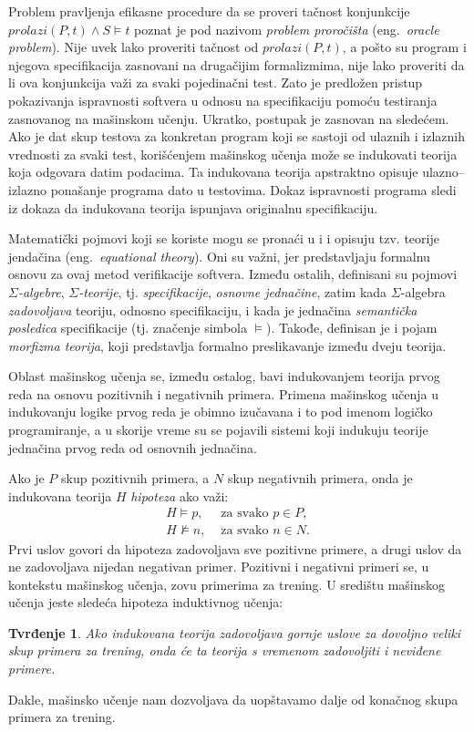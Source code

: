 \documentclass[a4paper]{article}
\newtheorem*{tvrdjenje}{Tvrđenje}
\theoremstyle{definition}
\begin{document}
{\par Problem pravljenja efikasne procedure da se proveri tačnost konjunkcije $prolazi(P,t)\wedge S\models t$ poznat je pod nazivom \emph{problem proročišta} (eng.~{\em oracle problem}). Nije uvek lako proveriti tačnost od $prolazi(P,t)$, a pošto su program i njegova specifikacija zasnovani na drugačijim formalizmima, nije lako proveriti da li ova konjunkcija važi za svaki pojedinačni test. Zato je predložen pristup pokazivanja ispravnosti softvera u odnosu na specifikaciju pomoću testiranja zasnovanog na mašinskom učenju. Ukratko, postupak je zasnovan na sledećem. Ako je dat skup testova za konkretan program koji se sastoji od ulaznih i izlaznih vrednosti za svaki test, korišćenjem mašinskog učenja može se indukovati teorija koja odgovara datim podacima. Ta indukovana teorija apstraktno opisuje ulazno--izlazno ponašanje programa dato u testovima. Dokaz ispravnosti programa sledi iz dokaza da indukovana teorija ispunjava originalnu specifikaciju.

\par Matematički pojmovi koji se koriste mogu se pronaći u \cite{verify} i \cite{equationaltheory} i opisuju tzv. teorije jendačina (eng.~{\em equational theory}). Oni su važni, jer predstavljaju formalnu osnovu za ovaj metod verifikacije softvera. Između ostalih, definisani su pojmovi \emph{$\Sigma$-algebre}, \emph{$\Sigma$-teorije}, tj. \emph{specifikacije}, \emph{osnovne jednačine}, zatim kada $\Sigma$-algebra \emph{zadovoljava} teoriju, odnosno specifikaciju, i kada je jednačina \emph{semantička posledica} specifikacije (tj. značenje simbola $\models$). Takođe, definisan je i pojam \emph{morfizma teorija}, koji predstavlja formalno preslikavanje između dveju teorija.

\par Oblast mašinskog učenja se, između ostalog, bavi indukovanjem teorija prvog reda na osnovu pozitivnih i negativnih primera. Primena mašinskog učenja u indukovanju logike prvog reda je obimno izučavana i to pod imenom logičko programiranje, a u skorije vreme su se pojavili sistemi koji indukuju teorije jednačina prvog reda od osnovnih jednačina.

\par Ako je $P$ skup pozitivnih primera, a $N$ skup negativnih primera, onda je indukovana teorija $H$ \emph{hipoteza} ako važi:
\begin{eqnarray*}
H\models p, & \mbox{ za svako } p\in P,\\
H\not\models n, & \mbox{ za svako } n\in N.
\end{eqnarray*}
Prvi uslov govori da hipoteza zadovoljava sve pozitivne primere, a drugi uslov da ne zadovoljava nijedan negativan primer. Pozitivni i negativni primeri se, u kontekstu mašinskog učenja, zovu primerima za trening. U središtu mašinskog učenja jeste sledeća hipoteza induktivnog učenja:
\begin{tvrdjenje}
Ako indukovana teorija zadovoljava gornje uslove za dovoljno veliki skup primera za trening, onda će ta teorija s vremenom zadovoljiti i neviđene primere.
\end{tvrdjenje}
Dakle, mašinsko učenje nam dozvoljava da uopštavamo dalje od ko\-na\-čnog skupa primera za trening.

}
\end{document}
